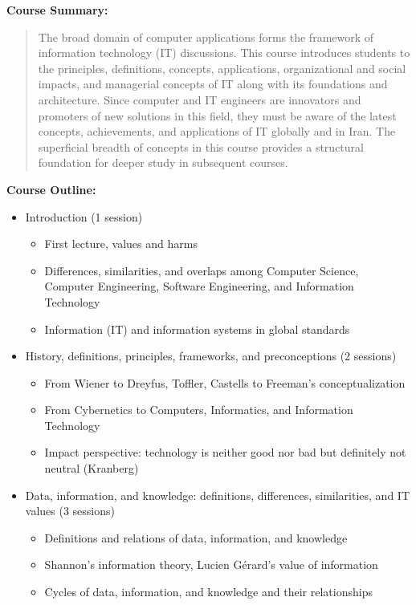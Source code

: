 \documentclass[12pt]{article}
\begin{document}
\textbf{Course Summary:} 
\begin{quote}
The broad domain of computer applications forms the framework of information technology (IT) discussions. This course introduces students to the principles, definitions, concepts, applications, organizational and social impacts, and managerial concepts of IT along with its foundations and architecture. Since computer and IT engineers are innovators and promoters of new solutions in this field, they must be aware of the latest concepts, achievements, and applications of IT globally and in Iran. The superficial breadth of concepts in this course provides a structural foundation for deeper study in subsequent courses.
\end{quote}

\textbf{Course Outline:}
\begin{itemize}
    \item Introduction (1 session)
    \begin{itemize}
        \item First lecture, values and harms
        \item Differences, similarities, and overlaps among Computer Science, Computer Engineering, Software Engineering, and Information Technology
        \item Information (IT) and information systems in global standards
    \end{itemize}
    \item History, definitions, principles, frameworks, and preconceptions (2 sessions)
    \begin{itemize}
        \item From Wiener to Dreyfus, Toffler, Castells to Freeman's conceptualization
        \item From Cybernetics to Computers, Informatics, and Information Technology
        \item Impact perspective: technology is neither good nor bad but definitely not neutral (Kranberg)
    \end{itemize}
    \item Data, information, and knowledge: definitions, differences, similarities, and IT values (3 sessions)
    \begin{itemize}
        \item Definitions and relations of data, information, and knowledge
        \item Shannon's information theory, Lucien Gérard's value of information
        \item Cycles of data, information, and knowledge and their relationships

\end{itemize}
\end{itemize}
\end{document}
